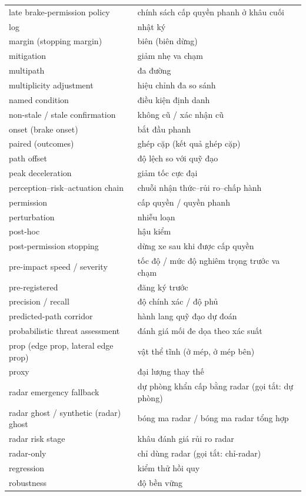 \documentclass[11pt,a4paper]{article}
\begin{document}
\begin{longtable}{@{}p{}p{}@{}}
late brake-permission policy & chính sách cấp quyền phanh ở khâu cuối\\
log & nhật ký\\
margin (stopping margin) & biên (biên dừng)\\
mitigation & giảm nhẹ va chạm\\
multipath & đa đường\\
multiplicity adjustment & hiệu chỉnh đa so sánh\\
named condition & điều kiện định danh\\
non-stale / stale confirmation & không cũ / xác nhận cũ\\
onset (brake onset) & bắt đầu phanh\\
paired (outcomes) & ghép cặp (kết quả ghép cặp)\\
path offset & độ lệch so với quỹ đạo\\
peak deceleration & giảm tốc cực đại\\
perception–risk–actuation chain & chuỗi nhận thức–rủi ro–chấp hành\\
permission & cấp quyền / quyền phanh\\
perturbation & nhiễu loạn\\
post-hoc & hậu kiểm\\
post-permission stopping & dừng xe sau khi được cấp quyền\\
pre-impact speed / severity & tốc độ / mức độ nghiêm trọng trước va chạm\\
pre-registered & đăng ký trước\\
precision / recall & độ chính xác / độ phủ\\
predicted-path corridor & hành lang quỹ đạo dự đoán\\
probabilistic threat assessment & đánh giá mối đe dọa theo xác suất\\
prop (edge prop, lateral edge prop) & vật thể tĩnh (ở mép, ở mép bên)\\
proxy & đại lượng thay thế\\
radar emergency fallback & dự phòng khẩn cấp bằng radar (gọi tắt: dự phòng)\\
radar ghost / synthetic (radar) ghost & bóng ma radar / bóng ma radar tổng hợp\\
radar risk stage & khâu đánh giá rủi ro radar\\
radar-only & chỉ dùng radar (gọi tắt: chỉ-radar)\\
regression & kiểm thử hồi quy\\
robustness & độ bền vững\\

\end{longtable}
\end{document}
